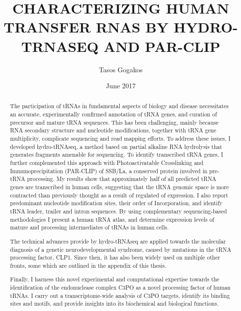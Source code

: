 \documentclass[12pt]{rockefeller}
\begin{document}
\author{Tasos Gogakos}
\title{\MakeUppercase{Characterizing human transfer rnas by hydro-trnaseq and par-clip}}
\date{June 2017}

\maketitle

\thispagestyle{empty}
\makecopyright

\begin{abstract}

The participation of tRNAs in fundamental aspects of biology and disease necessitates an accurate, experimentally confirmed annotation of tRNA genes, and curation of precursor and mature tRNA sequences. This has been challenging, mainly because RNA secondary structure and nucleotide modifications, together with tRNA gene multiplicity, complicate sequencing and read mapping efforts. To address these issues, I developed hydro-tRNAseq, a method based on partial alkaline RNA hydrolysis that generates fragments amenable for sequencing. To identify transcribed tRNA genes, I further complemented this approach with Photoactivatable Crosslinking and Immunoprecipitation (PAR-CLIP) of SSB/La, a conserved protein involved in pre-tRNA processing. My results show that approximately half of all predicted tRNA genes are transcribed in human cells, suggesting that the tRNA genomic space is more contracted than previously thought as a result of regulated of expression. I also report predominant nucleotide modification sites, their order of Incorporation, and identify tRNA leader, trailer and intron sequences. By using complementary sequencing-based methodologies I present a human tRNA atlas, and determine expression levels of mature and processing intermediates of tRNAs in human cells.

The technical advances provide by hydro-tRNAseq are applied towards the molecular diagnosis of a genetic neurodevelopmental syndrome, caused by mutations in the tRNA processing factor, CLP1. Since then, it has also been widely used on multiple other fronts, some which are outlined in the appendix of this thesis. 

Finally, I harness this novel experimental and computational expertise towards the identification of the endonuclease complex C3PO as a novel processing factor of human tRNAs. I carry out a transcriptome-wide analysis of C3PO targets, identify its binding sites and motifs, and provide insights into its biochemical and biological functions. 

\end{abstract}
\end{document}
